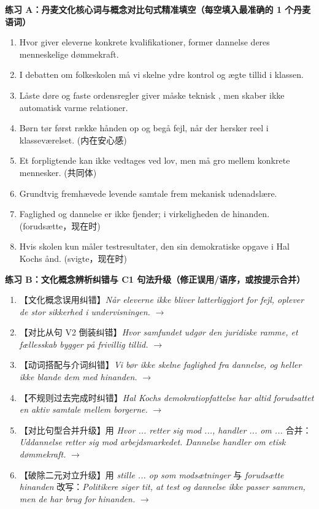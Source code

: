 \textbf{练习 A：丹麦文化核心词与概念对比句式精准填空（每空填入最准确的 1 个丹麦语词）}
\begin{enumerate}
  \item Hvor \underline{\hspace{2.2cm}} giver eleverne konkrete kvalifikationer, former dannelse deres menneskelige dømmekraft.
  \item I debatten om folkeskolen må vi skelne \underline{\hspace{2.2cm}} ydre kontrol og ægte tillid i klassen.
  \item Låste døre og faste ordensregler giver måske teknisk \underline{\hspace{2.2cm}}, men skaber ikke automatisk varme relationer.
  \item Børn tør først række hånden op og begå fejl, når der hersker reel \underline{\hspace{2.2cm}} i klasseværelset. (内在安心感)
  \item Et forpligtende \underline{\hspace{2.2cm}} kan ikke vedtages ved lov, men må gro mellem konkrete mennesker. (共同体)
  \item Grundtvig fremhævede levende samtale frem \underline{\hspace{2.2cm}} mekanisk udenadslære.
  \item Faglighed og dannelse er ikke fjender; i virkeligheden \underline{\hspace{2.2cm}} de hinanden. (forudsætte，现在时)
  \item Hvis skolen kun måler testresultater, \underline{\hspace{2.2cm}} den sin demokratiske opgave i Hal Kochs ånd. (svigte，现在时)
\end{enumerate}

\textbf{练习 B：文化概念辨析纠错与 C1 句法升级（修正误用/语序，或按提示合并）}
\begin{enumerate}
  \item 【文化概念误用纠错】\textit{Når eleverne ikke bliver latterliggjort for fejl, oplever de stor sikkerhed i undervisningen.} $\rightarrow$
  \item 【对比从句 V2 倒装纠错】\textit{Hvor samfundet udgør den juridiske ramme, et fællesskab bygger på frivillig tillid.} $\rightarrow$
  \item 【动词搭配与介词纠错】\textit{Vi bør ikke skelne faglighed fra dannelse, og heller ikke blande dem med hinanden.} $\rightarrow$
  \item 【不规则过去完成时纠错】\textit{Hal Kochs demokratiopfattelse har altid forudsattet en aktiv samtale mellem borgerne.} $\rightarrow$
  \item 【对比句型合并升级】用 \textit{Hvor ... retter sig mod ..., handler ... om ...} 合并：\textit{Uddannelse retter sig mod arbejdsmarkedet. Dannelse handler om etisk dømmekraft.} $\rightarrow$
  \item 【破除二元对立升级】用 \textit{stille ... op som modsætninger} 与 \textit{forudsætte hinanden} 改写：\textit{Politikere siger tit, at test og dannelse ikke passer sammen, men de har brug for hinanden.} $\rightarrow$
\end{enumerate}


